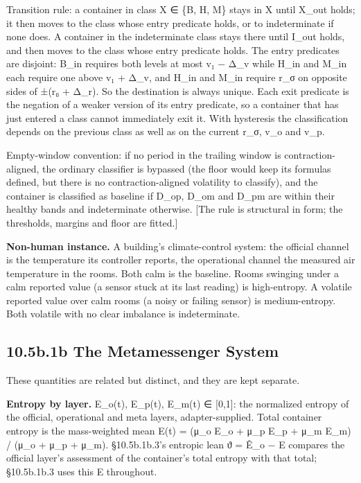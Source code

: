 \documentclass[
]{article}
\begin{document}
Transition rule: a container in class X ∈ \{B, H, M\} stays in X until
X\_out holds; it then moves to the class whose entry predicate holds, or
to indeterminate if none does. A container in the indeterminate class
stays there until I\_out holds, and then moves to the class whose entry
predicate holds. The entry predicates are disjoint: B\_in requires both
levels at most v₁ − Δ\_v while H\_in and M\_in each require one above v₁
+ Δ\_v, and H\_in and M\_in require r\_σ on opposite sides of ±(r₀ +
Δ\_r). So the destination is always unique. Each exit predicate is the
negation of a weaker version of its entry predicate, so a container that
has just entered a class cannot immediately exit it. With hysteresis the
classification depends on the previous class as well as on the current
r\_σ, v\_o and v\_p.

Empty-window convention: if no period in the trailing window is
contraction-aligned, the ordinary classifier is bypassed (the floor
would keep its formulas defined, but there is no contraction-aligned
volatility to classify), and the container is classified as baseline if
D\_op, D\_om and D\_pm are within their healthy bands and indeterminate
otherwise. {[}The rule is structural in form; the thresholds, margins
and floor are fitted.{]}

\textbf{Non-human instance.} A building's climate-control system: the
official channel is the temperature its controller reports, the
operational channel the measured air temperature in the rooms. Both calm
is the baseline. Rooms swinging under a calm reported value (a sensor
stuck at its last reading) is high-entropy. A volatile reported value
over calm rooms (a noisy or failing sensor) is medium-entropy. Both
volatile with no clear imbalance is indeterminate.

\hypertarget{b.1b-the-metamessenger-system}{%
\subsection{10.5b.1b The Metamessenger
System}\label{b.1b-the-metamessenger-system}}

These quantities are related but distinct, and they are kept separate.

\textbf{Entropy by layer.} E\_o(t), E\_p(t), E\_m(t) ∈ {[}0,1{]}: the
normalized entropy of the official, operational and meta layers,
adapter-supplied. Total container entropy is the mass-weighted mean E(t)
= (μ\_o E\_o + μ\_p E\_p + μ\_m E\_m) / (μ\_o + μ\_p + μ\_m).
§10.5b.1b.3's entropic lean ϑ = Ê\_o − E compares the official layer's
assessment of the container's total entropy with that total; §10.5b.1b.3
uses this E throughout.
\end{document}
